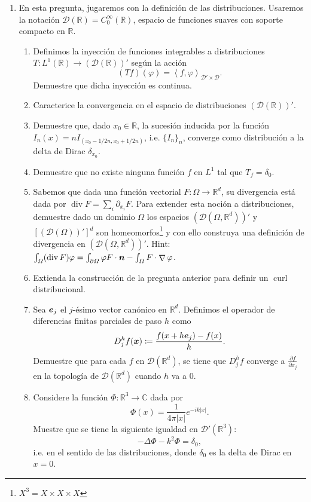 \documentclass{article}
\renewcommand{\vec}{\vectorsym}
\DeclareMathOperator{\grad}{\nabla}
\DeclareMathOperator{\dive}{\text{div}}
\DeclareMathOperator{\curl}{\text{curl}}
\newcommand{\R}{\mathbb{R}}
\newcommand{\pts}[1]{[{\bf #1 puntos}] }
\begin{document}
\begin{enumerate}
    \item En esta pregunta, jugaremos con la definición de las distribuciones. Usaremos la notación $\mathcal D(\R) = C_0^\infty(\R)$, espacio de funciones suaves con soporte compacto en $\R$.
        \begin{enumerate}
            \item\pts{1} Definimos la inyección de funciones integrables a distribuciones $T:L^1(\R) \to \left(\mathcal D(\R)\right)'$ según la acción
                $$ (Tf)(\varphi)  = \left\langle f, \varphi\right\rangle_{\mathcal D'\times \mathcal D}.$$
                Demuestre que dicha inyección es continua. 
            \item\pts{1}Caracterice la convergencia en el espacio de distribuciones $\left(\mathcal D(\R)\right)'$. 
            \item\pts{1}Demuestre que, dado $x_0\in \R$,  la sucesión inducida por la función $I_n(x) = nI_{(x_0-1/2n, x_0+1/2n)}$, i.e. $\{I_n\}_n$, converge como distribución a la delta de Dirac $\delta_{x_0}$. 
            \item\pts{1}Demuestre que no existe ninguna función $f$ en $L^1$ tal que $T_f = \delta_0$. 
            \item\pts{2} Sabemos que dada una función vectorial $F:\Omega \to \R^d$, su divergencia está dada por $\dive F=\sum_i \partial_{x_i}F$. Para extender esta noción a distribuciones, demuestre dado un dominio $\Omega$ los espacios $(\mathcal D(\Omega, \R^d))'$ y $[(\mathcal D(\Omega))']^d$ son homeomorfos\footnote{$X^3 = X\times X\times X$} y con ello construya una definición de divergencia en $(\mathcal D(\Omega, \R^d))'$. Hint: $\int_\Omega (\dive F)\varphi = \int_{\partial\Omega} \varphi F\cdot \vec n - \int_\Omega F\cdot \grad \varphi$. 
            \item\pts{2} Extienda la construcción de la pregunta anterior para definir un $\curl$ distribucional.
            \item\pts{2} Sea $\vec e_j$ el $j$-ésimo vector canónico en $\R^d$. Definimos el operador de diferencias finitas parciales de paso $h$ como
                $$ D_j^hf(\vec x) \coloneqq \frac{f(x+h\vec e_j) - f(x)}{h}. $$
                Demuestre que para cada $f$ en $\mathcal D(\R^d)$, se tiene que $D_j^hf $ converge a $\frac{\partial f}{\partial x_j}$ en la topología de $\mathcal D(\R^d)$ cuando $h$ va a 0.  
            \item\pts{2} Considere la función $\Phi:\R^3\to \mathbb C$ dada por
                    $$ \Phi(x) = \frac{1}{4\pi|x|} e^{-ik |x|}. $$
                Muestre que se tiene la siguiente igualdad en $\mathcal D'(\R^3)$:
                        $$ -\Delta \Phi - k^2 \Phi = \delta_0, $$
                i.e. en el sentido de las distribuciones, donde $\delta_0$ es la delta de Dirac en $x=0$. 
        \end{enumerate}
\end{enumerate}

\end{document}

